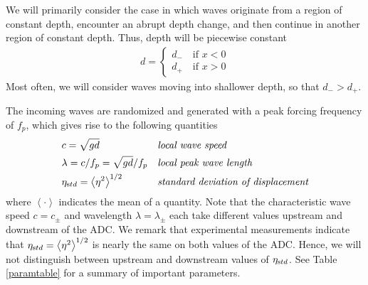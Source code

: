 \documentclass[11pt]{article}
\newcommand{\mean}[1]{\left< #1 \right>}
\newcommand{\freqp}{f_p}
\newcommand{\etastd}{\eta_{\text std}}
\newcommand{\depth}{d}
\newcommand{\dup}{\depth_{-}}
\newcommand{\ddn}{\depth_{+}}
\newcommand{\lam}{\lambda}
\newcommand{\lamupdn}{\lam_{\pm}}
\begin{document}
We will primarily consider the case in which waves originate from a region of constant depth, encounter an abrupt depth change, and then continue in another region of constant depth. Thus, depth will be piecewise constant
\begin{align}
\depth = 
\begin{cases}
\dup \quad \mbox{if } x<0 \\
\ddn \quad \mbox{if } x>0
\end{cases}
\end{align}
Most often, we will consider waves moving into shallower depth, so that $\dup > \ddn$. 

The incoming waves are randomized and generated with a peak forcing frequency of $\freqp$, which gives rise to the following quantities
\begin{align}
&c = \sqrt{g \depth}
&&\mbox{\em local wave speed} \\
&\lam = c/\freqp = \sqrt{g \depth} / \freqp
&&\mbox{\em local peak wave length} \\
&\etastd = \mean{\eta^2}^{1/2} 
&&\mbox{\em standard deviation of displacement} \\
\end{align}
where $\mean{\cdot}$ indicates the mean of a quantity. 
Note that the characteristic wave speed $c = c_{\pm}$ and wavelength $\lam = \lamupdn$ each take different values upstream and downstream of the ADC. We remark that experimental measurements indicate that $\etastd = \mean{\eta^2}^{1/2}$ is nearly the same on both values of the ADC. Hence, we will not distinguish between upstream and downstream values of $\etastd$.
%
See Table \ref{paramtable} for a summary of important parameters.
\end{document}
